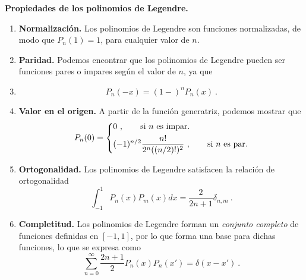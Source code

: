 \begin{propiedad}
    \textbf{Propiedades de los polinomios de Legendre.}

    \begin{enumerate}
        \item \textbf{Normalización.} Los polinomios de Legendre son funciones normalizadas, de modo que $P_n(1) = 1$, para cualquier valor de $n$.
        \item \textbf{Paridad.} Podemos encontrar que los polinomios de Legendre pueden ser funciones pares o impares según el valor de $n$, ya que
        \item \begin{equation}
            P_n(-x) = (1-)^n P_n(x) \ . 
        \end{equation}
    
        \item \textbf{Valor en el origen.} A partir de la función generatriz, podemos mostrar que
        \begin{equation}
            P_n(0) = \begin{dcases}
                0 \ , \qquad \text{si } n \text{ es impar.} \\
                (-1)^{n/2} \frac{n!}{2^n ((n/2)!)^2} \ , \qquad \text{si } n \text{ es par.}
            \end{dcases}
        \end{equation}
    
        \item \textbf{Ortogonalidad.} Los polinomios de Legendre satisfacen la relación de ortogonalidad
        \begin{equation}
            \int_{-1}^1 P_n(x) P_m(x) dx = \frac{2}{2n+1} \delta_{n,m} \ .
        \end{equation}
    
        \item \textbf{Completitud.} Los polinomios de Legendre forman un \emph{conjunto completo} de funciones definidas en $[-1,1]$, por lo que forma una base para dichas funciones, lo que se expresa como
        \begin{equation}
            \sum_{n=0}^\infty \frac{2n+1}{2} P_n(x) P_n(x') = \delta(x-x') \ .
        \end{equation}
    

\end{enumerate}
\end{propiedad}
